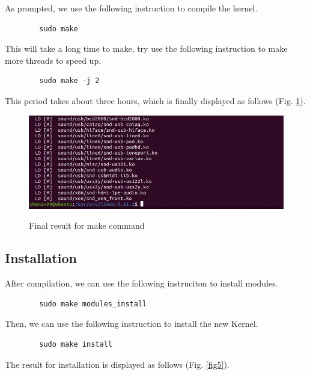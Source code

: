 \documentclass[a4paper, 12pt]{article}
\theoremstyle{definition}
\begin{document}
    As prompted, we use the following instruction to compile the kernel.

    \begin{lstlisting}
        sudo make
    \end{lstlisting}

    This will take a long time to make, try use the following instruction to make more threads to speed up.

    \begin{lstlisting}
        sudo make -j 2
    \end{lstlisting}

    This period takes about three hours, which is finally displayed as follows (Fig. \ref{fig4}).

    \begin{figure}[htbp]
        \centering
        \includegraphics[width=7in]{./pic/exe1/pic4.jpg}\\
        \caption{Final result for make command}\label{fig4}
    \end{figure}

    \subsection{Installation}

    After compilation, we can use the following instruciton to install modules.

    \begin{lstlisting}
        sudo make modules_install
    \end{lstlisting}

    Then, we can use the following instruction to install the new Kernel.

    \begin{lstlisting}
        sudo make install
    \end{lstlisting}

    The result for installation is displayed as follows (Fig. \ref{fig5}).
\end{document}
